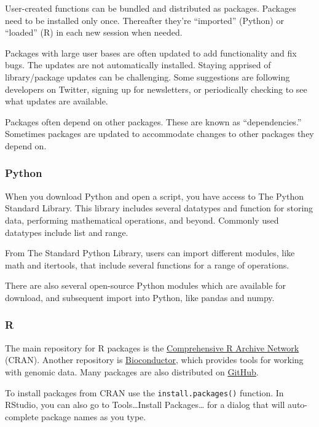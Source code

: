 \documentclass[
]{book}
\begin{document}
User-created functions can be bundled and distributed as packages. Packages need to be installed only once. Thereafter they're ``imported'' (Python) or ``loaded'' (R) in each new session when needed.

Packages with large user bases are often updated to add functionality and fix bugs. The updates are not automatically installed. Staying apprised of library/package updates can be challenging. Some suggestions are following developers on Twitter, signing up for newsletters, or periodically checking to see what updates are available.

Packages often depend on other packages. These are known as ``dependencies.'' Sometimes packages are updated to accommodate changes to other packages they depend on.

\hypertarget{python-3}{%
\subsubsection*{Python}\label{python-3}}

When you download Python and open a script, you have access to The Python Standard Library. This library includes several datatypes and function for storing data, performing mathematical operations, and beyond. Commonly used datatypes include list and range.

From The Standard Python Library, users can import different modules, like math and itertools, that include several functions for a range of operations.

There are also several open-source Python modules which are available for download, and subsequent import into Python, like pandas and numpy.

\hypertarget{r-3}{%
\subsubsection*{R}\label{r-3}}

The main repository for R packages is the \href{https://cran.r-project.org/}{Comprehensive R Archive Network} (CRAN). Another repository is \href{https://www.bioconductor.org/}{Bioconductor}, which provides tools for working with genomic data. Many packages are also distributed on \href{https://github.com/}{GitHub}.

To install packages from CRAN use the \texttt{install.packages()} function. In RStudio, you can also go to Tools\ldots Install Packages\ldots{} for a dialog that will auto-complete package names as you type.
\end{document}
